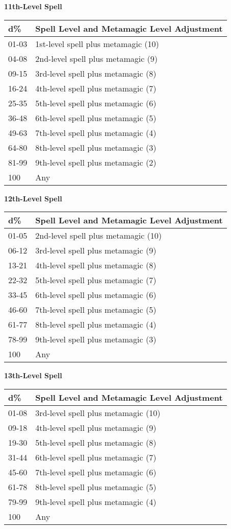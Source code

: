\documentclass{article}
\begin{document}
\vspace{12pt}
\textbf{11th-Level Spell }

\begin{tabular}{|>{\raggedright}p{29pt}|>{\raggedright}p{201pt}|}
\hline
d\textbf{\%} & S\textbf{pell Level and Metamagic Level Adjustment }\tabularnewline
\hline
01-03 & 1st-level spell plus metamagic (10) \tabularnewline
\hline
04-08 & 2nd-level spell plus metamagic (9) \tabularnewline
\hline
09-15 & 3rd-level spell plus metamagic (8) \tabularnewline
\hline
16-24 & 4th-level spell plus metamagic (7) \tabularnewline
\hline
25-35 & 5th-level spell plus metamagic (6) \tabularnewline
\hline
36-48 & 6th-level spell plus metamagic (5) \tabularnewline
\hline
49-63 & 7th-level spell plus metamagic (4) \tabularnewline
\hline
64-80 & 8th-level spell plus metamagic (3) \tabularnewline
\hline
81-99 & 9th-level spell plus metamagic (2) \tabularnewline
\hline
100 & Any \tabularnewline
\hline
\end{tabular}

\vspace{12pt}
\textbf{12th-Level Spell }

\begin{tabular}{|>{\raggedright}p{29pt}|>{\raggedright}p{201pt}|}
\hline
d\textbf{\%} & S\textbf{pell Level and Metamagic Level Adjustment }\tabularnewline
\hline
01-05 & 2nd-level spell plus metamagic (10) \tabularnewline
\hline
06-12 & 3rd-level spell plus metamagic (9) \tabularnewline
\hline
13-21 & 4th-level spell plus metamagic (8) \tabularnewline
\hline
22-32 & 5th-level spell plus metamagic (7) \tabularnewline
\hline
33-45 & 6th-level spell plus metamagic (6) \tabularnewline
\hline
46-60 & 7th-level spell plus metamagic (5) \tabularnewline
\hline
61-77 & 8th-level spell plus metamagic (4) \tabularnewline
\hline
78-99 & 9th-level spell plus metamagic (3) \tabularnewline
\hline
100 & Any \tabularnewline
\hline
\end{tabular}

\vspace{12pt}
\textbf{13th-Level Spell }

\begin{tabular}{|>{\raggedright}p{29pt}|>{\raggedright}p{198pt}|}
\hline
d\textbf{\%} & S\textbf{pell Level and Metamagic Level Adjustment}\tabularnewline
\hline
01-08 & 3rd-level spell plus metamagic (10) \tabularnewline
\hline
09-18 & 4th-level spell plus metamagic (9) \tabularnewline
\hline
19-30 & 5th-level spell plus metamagic (8) \tabularnewline
\hline
31-44 & 6th-level spell plus metamagic (7) \tabularnewline
\hline
45-60 & 7th-level spell plus metamagic (6) \tabularnewline
\hline
61-78 & 8th-level spell plus metamagic (5) \tabularnewline
\hline
79-99 & 9th-level spell plus metamagic (4) \tabularnewline
\hline
100 & Any\tabularnewline
\hline
\end{tabular}
\end{document}
